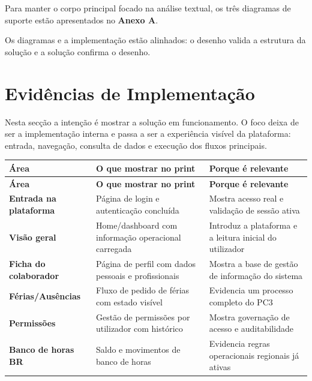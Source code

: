 \documentclass[11pt,a4paper,twoside]{article}
\newcommand{\tH}[1]{\textbf{\sffamily\small\color{white}#1}}
\newcommand{\theadrow}{\rowcolor{ACCENT}}
\begin{document}
\begin{callout}
Para manter o corpo principal focado na análise textual, os três diagramas de suporte estão apresentados no \textbf{Anexo A}.
\end{callout}

\begin{callout}
Os diagramas e a implementação estão alinhados: o desenho valida a estrutura da solução e a solução confirma o desenho.
\end{callout}

\section{Evidências de Implementação}

\begin{callout}
Nesta secção a intenção é mostrar a solução em funcionamento. O foco deixa de ser a implementação interna e passa a ser a experiência visível da plataforma: entrada, navegação, consulta de dados e execução dos fluxos principais.
\end{callout}

\begin{longtable}{>{\small\bfseries}p{3.6cm} >{\small}p{4.9cm} >{\small}p{5.2cm}}
\theadrow
\tH{Área} & \tH{O que mostrar no print} & \tH{Porque é relevante} \\
\midrule
\endfirsthead
\theadrow
\tH{Área} & \tH{O que mostrar no print} & \tH{Porque é relevante} \\
\midrule
\endhead
Entrada na plataforma & Página de login e autenticação concluída & Mostra acesso real e validação de sessão ativa \\
Visão geral & Home/dashboard com informação operacional carregada & Introduz a plataforma e a leitura inicial do utilizador \\
Ficha do colaborador & Página de perfil com dados pessoais e profissionais & Mostra a base de gestão de informação do sistema \\
Férias/Ausências & Fluxo de pedido de férias com estado visível & Evidencia um processo completo do PC3 \\
Permissões & Gestão de permissões por utilizador com histórico & Mostra governação de acesso e auditabilidade \\
Banco de horas BR & Saldo e movimentos de banco de horas & Evidencia regras operacionais regionais já ativas \\
\bottomrule
\end{longtable}
\end{document}
